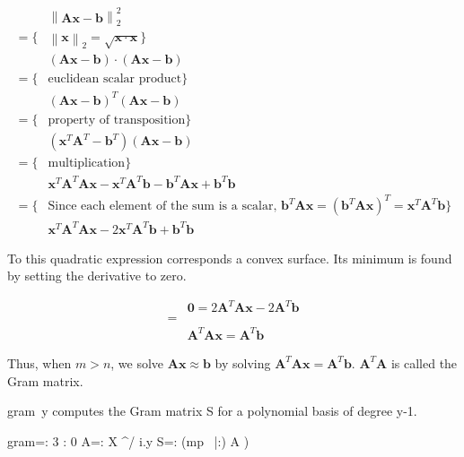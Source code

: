 \documentclass[10pt]{article}%
\renewcommand{\vec}[1]{\boldsymbol{#1}}
\newcommand{\norm}[1]{\left\lVert#1\right\rVert}
\begin{document}
\begin{align*}
 & \norm{\vec{A}\vec{x}-\vec{b}}^2_2 \\
= \{ & \norm{\vec{x}}_2 = \sqrt{\vec{x}\cdot\vec{x}} \} \\
 & \left(\vec{A}\vec{x}-\vec{b}\right) \cdot \left(\vec{A}\vec{x}-\vec{b}\right) \\
= \{ & \text{euclidean scalar product} \} \\
 & \left(\vec{A}\vec{x}-\vec{b}\right)^T \left(\vec{A}\vec{x}-\vec{b}\right) \\
= \{ & \text{property of transposition} \} \\
 & \left(\vec{x}^T\vec{A}^T - \vec{b}^T \right) \left(\vec{A}\vec{x}-\vec{b}\right) \\
= \{ & \text{multiplication} \} \\
 & \vec{x}^T\vec{A}^T\vec{A}\vec{x} - \vec{x}^T\vec{A}^T\vec{b} - \vec{b}^T\vec{A}\vec{x} + \vec{b}^T\vec{b} \\
= \{ & \text{Since each element of the sum is a scalar, } \vec{b}^T\vec{A}\vec{x} = \left(\vec{b}^T\vec{A}\vec{x}\right)^T = \vec{x}^T\vec{A}^T\vec{b} \} \\
 & \vec{x}^T\vec{A}^T\vec{A}\vec{x} - 2\vec{x}^T\vec{A}^T\vec{b} + \vec{b}^T\vec{b}
\end{align*}

To this quadratic expression corresponds a convex surface.
Its minimum is found by setting the derivative to zero.

\begin{align*}
 & \vec{0} = 2\vec{A}^T\vec{A}\vec{x} - 2\vec{A}^T\vec{b} \\
=& \\
 & \vec{A}^T\vec{A}\vec{x} = \vec{A}^T\vec{b}
\end{align*}

Thus, when $m>n$, we solve $\vec{A}\vec{x}\approx\vec{b}$ by solving
$\vec{A}^T\vec{A}\vec{x} = \vec{A}^T\vec{b}$.
$\vec{A}^T\vec{A}$ is called the Gram matrix.

{\Tt{}gram\ y\nwendquote} computes the Gram matrix {\Tt{}S\nwendquote} for a polynomial basis of degree {\Tt{}y-1\nwendquote}.

\nwenddocs{}\endmoddef\nwstartdeflinemarkup{}\nwenddeflinemarkup
gram=: 3 : 0
  A=: X ^/ i.y
  S=: (mp~ |:) A
) 
\end{document}
